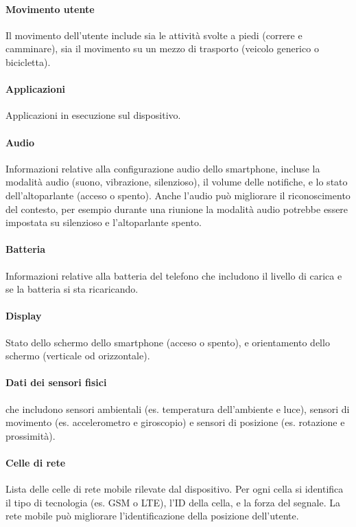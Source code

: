 \documentclass[12pt,italian]{report}
\begin{document}
\paragraph{Movimento utente} Il movimento dell'utente include sia le attività svolte a piedi (correre e camminare), sia il movimento su un mezzo di trasporto (veicolo generico o bicicletta).

\paragraph{Applicazioni} Applicazioni in esecuzione sul dispositivo.

\paragraph{Audio}  Informazioni relative alla configurazione audio dello smartphone, incluse la modalità audio (suono, vibrazione, silenzioso), il volume delle notifiche, e lo stato dell'altoparlante (acceso o spento). Anche l'audio può migliorare il riconoscimento del contesto, per esempio durante una riunione la modalità audio potrebbe essere impostata su silenzioso e l'altoparlante spento.

\paragraph{Batteria} Informazioni relative alla batteria del telefono che includono il livello di carica e se la batteria si sta ricaricando. 

\paragraph{Display}  Stato dello schermo dello smartphone (acceso o spento), e orientamento dello schermo (verticale od orizzontale).

\paragraph{Dati dei sensori fisici} che includono sensori ambientali (es. temperatura dell'ambiente e luce), sensori di movimento (es. accelerometro e giroscopio) e sensori di posizione (es. rotazione e prossimità).

\paragraph{Celle di rete} Lista delle celle di rete mobile rilevate dal dispositivo. Per ogni cella si identifica il tipo di tecnologia (es. GSM o LTE), l'ID della cella, e la forza del segnale. La rete mobile può migliorare l'identificazione della posizione dell'utente.
\end{document}
